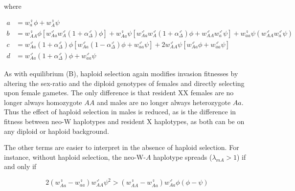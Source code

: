\documentclass[12pt]{article}
\begin{document}
\noindent
where 

\begin{subequations}
\begin{align}
a &= w_a^\female \phi + w_A^\female \psi \\
b &= w_{AA}^\female \phi \left[ w_{Aa}^\male w_A^\male (1+\alpha^\male_\Delta) \phi \right]+ w_{Aa}^\female \psi \left[ w_{Aa}^\male w_A^\male (1+\alpha^\male_\Delta) \phi + w_{AA}^\male w_a^\male \psi \right] + w_{aa}^\female \psi \left( w_{AA}^\male w_a^\male \psi \right)\\
c &= 
w_{Aa}^\male (1+\alpha^\male_\Delta) \phi \left[ w_{Aa}^\male (1-\alpha^\male_\Delta) \phi + w_{aa}^\male \psi \right] +
2 w_{AA}^\male\psi \left[ w_{Aa}^\male \phi + w_{aa}^\male \psi \right]
 \\
d &= w_{Aa}^\male (1+\alpha^\male_\Delta) \phi + w_{aa}^\male \psi
\end{align}
\end{subequations}

As with equilibrium (B), haploid selection again modifies invasion fitnesses by altering the sex-ratio and the diploid genotypes of females and directly selecting upon female gametes.
The only difference is that resident XX females are no longer always homozygote $AA$ and males are no longer always heterozygote $Aa$.
Thus the effect of haploid selection in males is reduced, as is the difference in fitness between neo-W haplotypes and resident X haplotypes, as both can be on any diploid or haploid background.  

The other terms are easier to interpret in the absence of haploid selection.
For instance, without haploid selection, the neo-W-$A$ haplotype spreads ($\lambda_{mA}>1$) if and only if

\begin{equation}\label{eq:BeqWAspread}
2(w_{Aa}^\female-w_{aa}^\female)w_{AA}^\male \psi^2 > (w_{AA}^\female-w_{Aa}^\female)w_{Aa}^\male \phi (\phi-\psi)
\end{equation}
\end{document}
